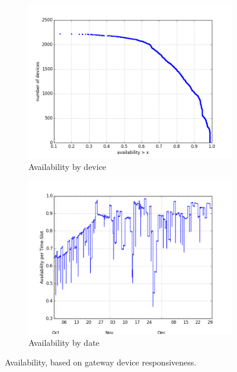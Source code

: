 \begin{figure}[t!]
\begin{minipage}{1\linewidth}
%
\begin{subfigure}[b]{0.45\linewidth}
\includegraphics[width=\linewidth]{figures/250-test_dw-availability-CDF.png}
  \caption{Availability by device}
  \label{fig:availability-device}
\end{subfigure} \hfill
%
\begin{subfigure}[b]{0.45\linewidth}
\includegraphics[width=\linewidth]{figures/250-test_dw-availability-by-date.png}
  \caption{Availability by date}
  \label{fig:availability-date}
\end{subfigure} \hfill
%
\end{minipage}
\caption{Availability, based on gateway device responsiveness. }
\label{fig:availability}
\end{figure}

